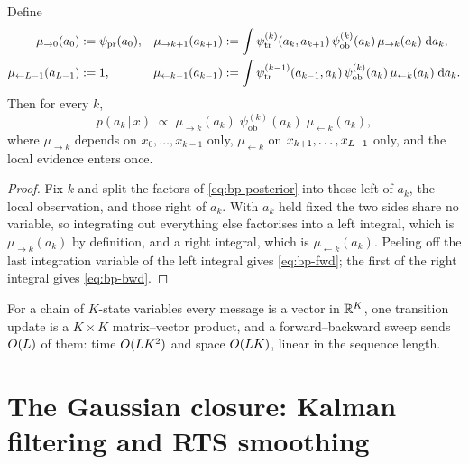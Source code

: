 \begin{proposition}\label{prop:bp-convA}
Define
\begin{align}
  \mu_{\to 0}(a_0) &:= \psi_{\mathrm{pr}}(a_0),
  &
  \mu_{\to k+1}(a_{k+1}) &:= \int
    \psi^{(k)}_{\mathrm{tr}}(a_k, a_{k+1})\,
    \psi^{(k)}_{\mathrm{ob}}(a_k)\,
    \mu_{\to k}(a_k)\; \mathrm{d} a_k ,
  \label{eq:bp-fwd}\\
  \mu_{\leftarrow L-1}(a_{L-1}) &:= 1,
  &
  \mu_{\leftarrow k-1}(a_{k-1}) &:= \int
    \psi^{(k-1)}_{\mathrm{tr}}(a_{k-1}, a_k)\,
    \psi^{(k)}_{\mathrm{ob}}(a_k)\,
    \mu_{\leftarrow k}(a_k)\; \mathrm{d} a_k .
  \label{eq:bp-bwd}
\end{align}
Then for every $k$,
\begin{equation}
  p(a_k \,|\, x) \;\propto\;
  \mu_{\to k}(a_k)\;
  \psi^{(k)}_{\mathrm{ob}}(a_k)\;
  \mu_{\leftarrow k}(a_k) ,
  \label{eq:bp-combine}
\end{equation}
where $\mu_{\to k}$ depends on $x_0,\dots,x_{k-1}$ only, $\mu_{\leftarrow k}$
on $x_{k+1},\dots,x_{L-1}$ only, and the local evidence enters once.
\end{proposition}

\begin{proof}
Fix $k$ and split the factors of \eqref{eq:bp-posterior} into those left of
$a_k$, the local observation, and those right of $a_k$. With $a_k$ held
fixed the two sides share no variable, so integrating out everything else
factorises into a left integral, which is $\mu_{\to k}(a_k)$ by definition,
and a right integral, which is $\mu_{\leftarrow k}(a_k)$. Peeling off the last
integration variable of the left integral gives \eqref{eq:bp-fwd}; the first
of the right integral gives \eqref{eq:bp-bwd}.
\end{proof}

For a chain of $K$-state variables every message is a vector in $\mathbb{R}^K$, one
transition update is a $K \times K$ matrix--vector product, and a
forward--backward sweep sends $O(L)$ of them: time $O(L K^2)$
and space $O(L K)$, linear in the sequence length.

\section{The Gaussian closure: Kalman filtering and RTS smoothing}
\label{sec:bp-gaussian}

